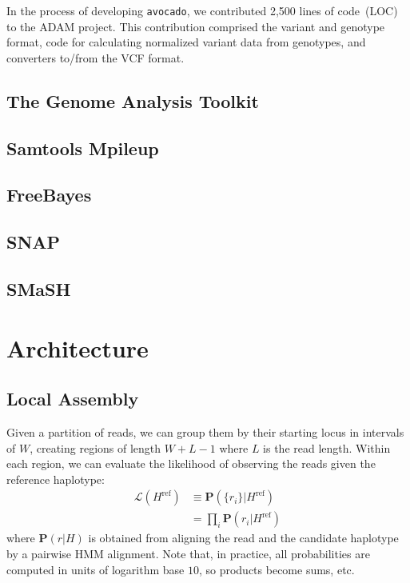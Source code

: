 \documentclass{acm_proc_article-sp}
\begin{document}
In the process of developing \texttt{avocado}, we contributed 2,500 lines of code~(LOC) to the ADAM project. This contribution comprised
the variant and genotype format, code for calculating normalized variant data from genotypes, and converters to/from the VCF format.

\subsection{The Genome Analysis Toolkit}
\label{sec:gatk}


\cite{mckenna10, depristo11}

\subsection{Samtools Mpileup}
\label{sec:samtools}


\cite{li11}

\subsection{FreeBayes}
\label{sec:freebayes}

\cite{garrison12}

\subsection{SNAP}
\label{sec:snap}


\subsection{SMaSH}
\label{sec:smash}


\section{Architecture}
\label{sec:architecture}


\subsection{Local Assembly}
\label{sec:local-assembly}


Given a partition of reads, we can group them by their starting locus in
intervals of $W$, creating regions of length $W+L-1$ where $L$ is the
read length.
Within each region, we can evaluate the likelihood of observing the reads
given the reference haplotype:
\begin{align}
  \mathcal L(H^\text{ref})
  &\equiv\mathbf P(\{r_i\}|H^\text{ref}) \\ \nonumber
  &=\prod_i\mathbf P(r_i|H^\text{ref})
\end{align}
where $\mathbf P(r|H)$ is obtained from aligning the read and the
candidate haplotype by a pairwise HMM alignment.
Note that, in practice, all probabilities are computed in units of logarithm
base $10$, so products become sums, etc.
\end{document}
